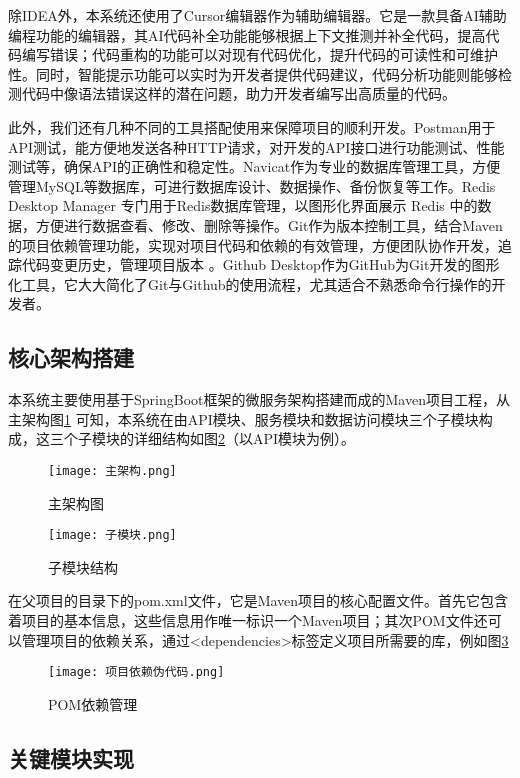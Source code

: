 除IDEA外，本系统还使用了Cursor编辑器作为辅助编辑器。它是一款具备AI辅助编程功能的编辑器，其AI代码补全功能能够根据上下文推测并补全代码，提高代码编写错误；代码重构的功能可以对现有代码优化，提升代码的可读性和可维护性。同时，智能提示功能可以实时为开发者提供代码建议，代码分析功能则能够检测代码中像语法错误这样的潜在问题，助力开发者编写出高质量的代码。

此外，我们还有几种不同的工具搭配使用来保障项目的顺利开发。Postman用于API测试，能方便地发送各种HTTP请求，对开发的API接口进行功能测试、性能测试等，确保API的正确性和稳定性。Navicat作为专业的数据库管理工具，方便管理MySQL等数据库，可进行数据库设计、数据操作、备份恢复等工作。Redis Desktop Manager 专门用于Redis数据库管理，以图形化界面展示 Redis 中的数据，方便进行数据查看、修改、删除等操作。Git作为版本控制工具，结合Maven的项目依赖管理功能，实现对项目代码和依赖的有效管理，方便团队协作开发，追踪代码变更历史，管理项目版本 。Github Desktop作为GitHub为Git开发的图形化工具，它大大简化了Git与Github的使用流程，尤其适合不熟悉命令行操作的开发者。

\subsection{核心架构搭建}

本系统主要使用基于SpringBoot框架的微服务架构搭建而成的Maven项目工程，从主架构图\ref{主架构图}
可知，本系统在由API模块、服务模块和数据访问模块三个子模块构成，这三个子模块的详细结构如图\ref{子模块结构}（以API模块为例）。
\begin{figure}[hbt]
    \centering
    \texttt{[image: 主架构.png]}
    \caption{主架构图}
    \label{主架构图}
\end{figure}

\begin{figure}[hbt]
    \centering
    \texttt{[image: 子模块.png]}
    \caption{子模块结构}
    \label{子模块结构}
\end{figure}

在父项目的目录下的pom.xml文件，它是Maven项目的核心配置文件。首先它包含着项目的基本信息，这些信息用作唯一标识一个Maven项目；其次POM文件还可以管理项目的依赖关系，通过<dependencies>标签定义项目所需要的库，例如图\ref{POM依赖管理}

\begin{figure}[hbt]
    \centering
    \texttt{[image: 项目依赖伪代码.png]}
    \caption{POM依赖管理}
    \label{POM依赖管理}
\end{figure}

\subsection{关键模块实现}

